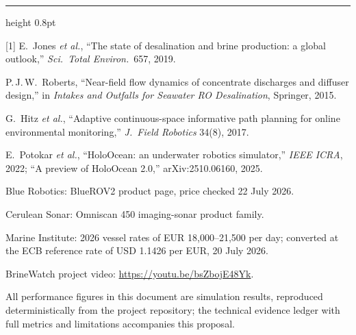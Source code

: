\documentclass[10pt,a4paper]{article}
\begin{document}
\vspace{4pt}
{\color{hairline}\hrule height 0.8pt}
\vspace{4pt}
{\footnotesize\color{muted}
[1] E.~Jones \emph{et al.}, ``The state of desalination and brine production: a global outlook,'' \emph{Sci.\ Total Environ.}~657, 2019.\par
[2] P.\,J.\,W.~Roberts, ``Near-field flow dynamics of concentrate discharges and diffuser design,'' in \emph{Intakes and Outfalls for Seawater RO Desalination}, Springer, 2015.\par
[3] G.~Hitz \emph{et al.}, ``Adaptive continuous-space informative path planning for online environmental monitoring,'' \emph{J.~Field Robotics} 34(8), 2017.\par
[4] E.~Potokar \emph{et al.}, ``HoloOcean: an underwater robotics simulator,'' \emph{IEEE ICRA}, 2022; ``A preview of HoloOcean 2.0,'' arXiv:2510.06160, 2025.\par
[5] Blue Robotics: BlueROV2 product page, price checked 22 July 2026.\par
[6] Cerulean Sonar: Omniscan 450 imaging-sonar product family.\par
[7] Marine Institute: 2026 vessel rates of EUR 18{,}000--21{,}500 per day; converted at the ECB
reference rate of USD 1.1426 per EUR, 20 July 2026.\par
[8] BrineWatch project video: \url{https://youtu.be/bsZbojE48Yk}.\par
All performance figures in this document are simulation results, reproduced deterministically from
the project repository; the technical evidence ledger with full metrics and limitations accompanies
this proposal.}
\end{document}
